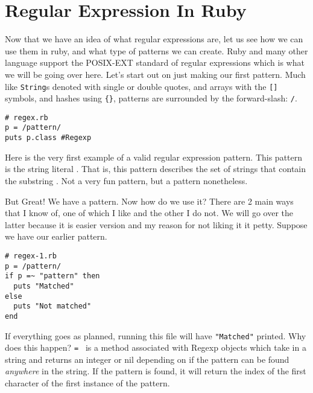 \documentclass[main.tex]{subfiles}
\begin{document}
\section{Regular Expression In Ruby}

Now that we have an idea of what regular expressions are, let us see how we can use them in ruby, and what type of patterns we can create. 
Ruby and many other language support the POSIX-EXT standard of regular expressions which is what we will be going over here. 
Let's start out on just making our first pattern. 
Much like \texttt{String}s denoted with single or double quotes, and arrays with the \texttt{[]} symbols, and hashes using \texttt{\{\}}, patterns are surrounded by the forward-slash: \texttt{/}. 
\begin{lstlisting}[style=MyRubyStyle]
# regex.rb
p = /pattern/
puts p.class #Regexp
\end{lstlisting}

Here is the very first example of a valid regular expression pattern. 
This pattern is the string literal .
That is, this pattern describes the set of strings that contain the substring .
Not a very fun pattern, but a pattern nonetheless. 

But Great! We have a pattern. Now how do we use it? 
There are 2 main ways that I know of, one of which I like and the other I do not. We will go over the latter because it is easier version and my reason for not liking it it petty. Suppose we have our earlier pattern. 

\begin{lstlisting}[style=MyRubyStyle]
# regex-1.rb
p = /pattern/
if p =~ "pattern" then 
  puts "Matched"
else
  puts "Not matched"
end
\end{lstlisting}
If everything goes as planned, running this file will have \texttt{"Matched"} printed. Why does this happen? 
\texttt{=~} is a method associated with Regexp objects which take in a string and returns an integer or nil depending on if
the pattern can be found \textit{anywhere} in the string. If the pattern is found, it will return the index of the first 
character of the first instance of the pattern. 
\end{document}
